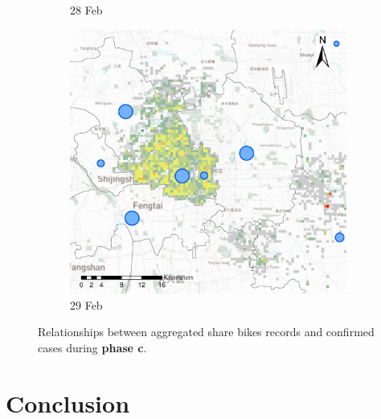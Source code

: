 \documentclass[preprints,article,accept,moreauthors,pdftex]{Definitions/mdpi}
\begin{document}
\begin{figure}[ht]
\begin{subfigure}{.3\textwidth}
        \caption{28 Feb}\label{fig:correlation_02_28}
    \end{subfigure}
    \begin{subfigure}{.3\textwidth}
        \includegraphics[width=\textwidth]{Figures/Relation_with_confrimed_cases/NewDistrictSSBD2020_02_29.eps}
        \caption{29 Feb}\label{fig:correlation_02_29}
    \end{subfigure}
    \caption{Relationships between aggregated share bikes records and confirmed cases during \textbf{phase c}.}
    \label{fig:BSS_phase_3}
\end{figure}


\section{Conclusion}
\end{document}
